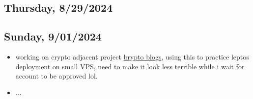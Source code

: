 \subsection*{Thursday, 8/29/2024}

\subsection{Sunday, 9/01/2024}
\begin{itemize}
    \item working on crypto adjacent project
        \textcolor{blue}{\href{https://bryptoblogs.xyz}{brypto blogs}}, using this to
        practice leptos deployment on small VPS, need to make it look less
        terrible while i wait for account to be approved lol.
    \item ...
\end{itemize}
